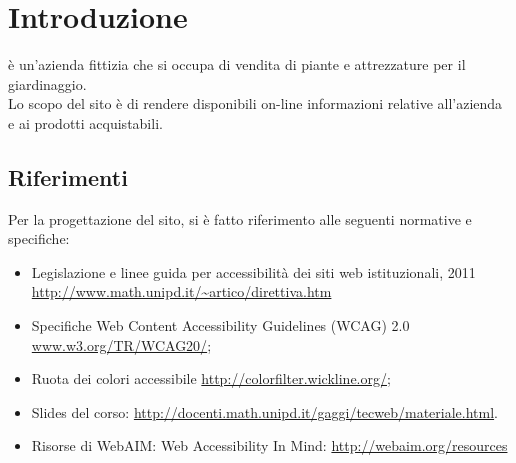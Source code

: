 \section{Introduzione}{
	\textbf{\ggt}  è un'azienda fittizia che si occupa di vendita di piante e attrezzature per il giardinaggio. \\
	Lo scopo del sito è di rendere disponibili on-line informazioni relative all'azienda e ai prodotti acquistabili. 
	
    \subsection{Riferimenti}{
		Per la progettazione del sito, si è fatto riferimento alle seguenti normative e specifiche:
		\begin{itemize}\itemsep0.5pt
			\item Legislazione e linee guida per accessibilità dei siti web istituzionali, 2011 \url{http://www.math.unipd.it/~artico/direttiva.htm}
			\item Specifiche Web Content Accessibility Guidelines (WCAG) 2.0 \url{www.w3.org/TR/WCAG20/};
			\item Ruota dei colori accessibile \url{http://colorfilter.wickline.org/};
			\item Slides del corso: \url{http://docenti.math.unipd.it/gaggi/tecweb/materiale.html}.
			\item Risorse di WebAIM: Web Accessibility In Mind: \url{http://webaim.org/resources}
		\end{itemize}
    }
}
